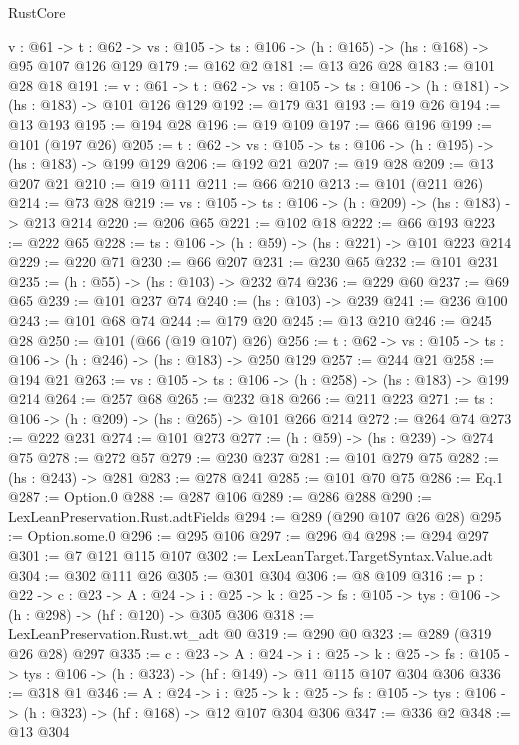 \begin{lexlean}{RustCore}
\begin{coremodule}
  {v : @61} ->
  {t : @62} -> {vs : @105} -> {ts : @106} -> (h : @165) -> (hs : @168) -> @95 @107 @126 @129
@179 := @162 @2
@181 := @13 @26 @28
@183 := @101 @28 @18
@191 := {v : @61} ->
  {t : @62} -> {vs : @105} -> {ts : @106} -> (h : @181) -> (hs : @183) -> @101 @126 @129
@192 := @179 @31
@193 := @19 @26
@194 := @13 @193
@195 := @194 @28
@196 := @19 @109
@197 := @66 @196
@199 := @101 (@197 @26)
@205 := {t : @62} -> {vs : @105} -> {ts : @106} -> (h : @195) -> (hs : @183) -> @199 @129
@206 := @192 @21
@207 := @19 @28
@209 := @13 @207 @21
@210 := @19 @111
@211 := @66 @210
@213 := @101 (@211 @26)
@214 := @73 @28
@219 := {vs : @105} -> {ts : @106} -> (h : @209) -> (hs : @183) -> @213 @214
@220 := @206 @65
@221 := @102 @18
@222 := @66 @193
@223 := @222 @65
@228 := {ts : @106} -> (h : @59) -> (hs : @221) -> @101 @223 @214
@229 := @220 @71
@230 := @66 @207
@231 := @230 @65
@232 := @101 @231
@235 := (h : @55) -> (hs : @103) -> @232 @74
@236 := @229 @60
@237 := @69 @65
@239 := @101 @237 @74
@240 := (hs : @103) -> @239
@241 := @236 @100
@243 := @101 @68 @74
@244 := @179 @20
@245 := @13 @210
@246 := @245 @28
@250 := @101 (@66 (@19 @107) @26)
@256 := {t : @62} -> {vs : @105} -> {ts : @106} -> (h : @246) -> (hs : @183) -> @250 @129
@257 := @244 @21
@258 := @194 @21
@263 := {vs : @105} -> {ts : @106} -> (h : @258) -> (hs : @183) -> @199 @214
@264 := @257 @68
@265 := @232 @18
@266 := @211 @223
@271 := {ts : @106} -> (h : @209) -> (hs : @265) -> @101 @266 @214
@272 := @264 @74
@273 := @222 @231
@274 := @101 @273
@277 := (h : @59) -> (hs : @239) -> @274 @75
@278 := @272 @57
@279 := @230 @237
@281 := @101 @279 @75
@282 := (hs : @243) -> @281
@283 := @278 @241
@285 := @101 @70 @75
@286 := Eq.{1}
@287 := Option.{0}
@288 := @287 @106
@289 := @286 @288
@290 := LexLeanPreservation.Rust.adtFields
@294 := @289 (@290 @107 @26 @28)
@295 := Option.some.{0}
@296 := @295 @106
@297 := @296 @4
@298 := @294 @297
@301 := @7 @121 @115 @107
@302 := LexLeanTarget.TargetSyntax.Value.adt
@304 := @302 @111 @26
@305 := @301 @304
@306 := @8 @109
@316 := {p : @22} ->
  {c : @23} ->
  {A : @24} ->
  {i : @25} -> {k : @25} -> {fs : @105} -> {tys : @106} -> (h : @298) -> (hf : @120) -> @305 @306
@318 := LexLeanPreservation.Rust.wt_adt @0
@319 := @290 @0
@323 := @289 (@319 @26 @28) @297
@335 := {c : @23} ->
  {A : @24} ->
  {i : @25} ->
  {k : @25} -> {fs : @105} -> {tys : @106} -> (h : @323) -> (hf : @149) -> @11 @115 @107 @304 @306
@336 := @318 @1
@346 := {A : @24} ->
  {i : @25} ->
  {k : @25} -> {fs : @105} -> {tys : @106} -> (h : @323) -> (hf : @168) -> @12 @107 @304 @306
@347 := @336 @2
@348 := @13 @304

\end{coremodule}
\end{lexlean}
